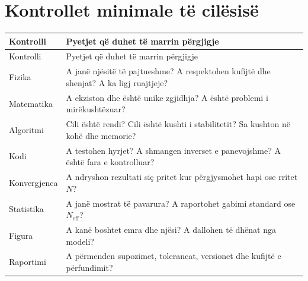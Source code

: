 \section{Kontrollet minimale të cilësisë}
\begin{longtable}{p{}p{}}
\toprule
Kontrolli & Pyetjet që duhet të marrin përgjigje\\ \midrule
\endfirsthead
\toprule Kontrolli & Pyetjet që duhet të marrin përgjigje\\ \midrule\endhead
Fizika & A janë njësitë të pajtueshme? A respektohen kufijtë dhe shenjat? A ka ligj ruajtjeje?\\
Matematika & A ekziston dhe është unike zgjidhja? A është problemi i mirëkushtëzuar?\\
Algoritmi & Cili është rendi? Cili është kushti i stabilitetit? Sa kushton në kohë dhe memorie?\\
Kodi & A testohen hyrjet? A shmangen inverset e panevojshme? A është fara e kontrolluar?\\
Konvergjenca & A ndryshon rezultati siç pritet kur përgjysmohet hapi ose rritet $N$?\\
Statistika & A janë mostrat të pavarura? A raportohet gabimi standard ose $N_{\mathrm{eff}}$?\\
Figura & A kanë boshtet emra dhe njësi? A dallohen të dhënat nga modeli?\\
Raportimi & A përmenden supozimet, tolerancat, versionet dhe kufijtë e përfundimit?\\
\bottomrule
\end{longtable}

